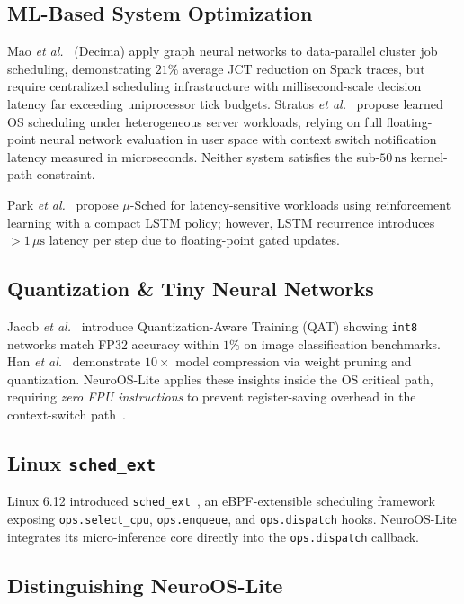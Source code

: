 \subsection{ML-Based System Optimization}

Mao \textit{et al.}~\cite{Mao2019} (Decima) apply graph neural networks to
data-parallel cluster job scheduling, demonstrating $21\%$ average JCT
reduction on Spark traces, but require centralized scheduling infrastructure
with millisecond-scale decision latency far exceeding uniprocessor tick budgets.
Stratos \textit{et al.}~\cite{Stratos2020} propose learned OS scheduling under
heterogeneous server workloads, relying on full floating-point neural network
evaluation in user space with context switch notification latency measured in
microseconds. Neither system satisfies the sub-$50\,\text{ns}$
kernel-path constraint.

Park \textit{et al.}~\cite{Park2020} propose $\mu$-Sched for latency-sensitive
workloads using reinforcement learning with a compact LSTM policy; however,
LSTM recurrence introduces $>1\,\mu\text{s}$ latency per step due to
floating-point gated updates.

\subsection{Quantization \& Tiny Neural Networks}

Jacob \textit{et al.}~\cite{Jacob2018} introduce Quantization-Aware Training
(QAT) showing \texttt{int8} networks match FP32 accuracy within $1\%$ on image
classification benchmarks. Han \textit{et al.}~\cite{Han2016} demonstrate
$10\times$ model compression via weight pruning and quantization.
NeuroOS-Lite applies these insights inside the OS critical path, requiring
\emph{zero FPU instructions} to prevent register-saving overhead in the
context-switch path~\cite{IntelSysProgGuide}.

\subsection{Linux \texttt{sched\_ext}}

Linux 6.12 introduced \texttt{sched\_ext}~\cite{schedext2024}, an eBPF-extensible
scheduling framework exposing \texttt{ops.select\_cpu}, \texttt{ops.enqueue},
and \texttt{ops.dispatch} hooks. NeuroOS-Lite integrates its micro-inference
core directly into the \texttt{ops.dispatch} callback.

\subsection{Distinguishing NeuroOS-Lite}

